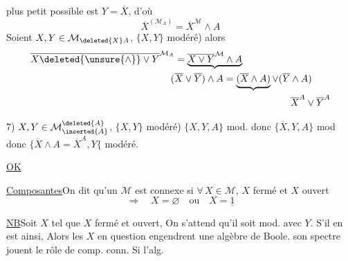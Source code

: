 plus petit possible est $Y=\overline X$, d'où 
\[
\overline X^{(\mathcal M_A)}=\overline X^{\mathcal M}\wedge A
\]
Soient $X,Y\in \mathcal M_{\deleted{X}A}$, $\{X,Y\}$ modéré) alors
\[
\begin{aligned}
\overline{X\deleted{\unsure{\wedge}}\vee Y}^{\mathcal M_A}
   &=\underbrace{\overline{X\vee Y}^{\mathcal M}\wedge A}\\
   &\hspace{-.4em}(\overline X\vee\overline Y)\wedge A
       =\underbrace{(\overline X\wedge A)}\vee(\overline Y\wedge A)\\
   &\hspace{12em}\overline X^A\vee\overline Y^A
\end{aligned}
\]

7) $X,Y\in \mathcal M_{\inserted{A}}^{\deleted{A}}$, $\{X,Y\}$ modéré)   $\{X,Y,A\}$ mod. donc $\{\overline X,Y,A\}$ mod donc $\{\overline X\wedge A=\overline X^A,Y\{$ modéré.

\uline{OK}

\uline{Composantes}\qquad On dit qu'un $\mathcal M$ est connexe si  $\forall\,X\in \mathcal M$, $X$ fermé et $X$ ouvert
\[
\Longrightarrow\quad X=\varnothing\quad\text{ou}\quad X=\underline{1}
\]

\uline{NB}\qquad Soit $X$ tel que $X$ fermé et ouvert, On s'attend qu'il soit mod. avec  $Y$. S'il en est ainsi, Alors les $X$ en question engendrent une algèbre de Boole.    son spectre jouent le rôle de comp. conn. Si l'alg.
